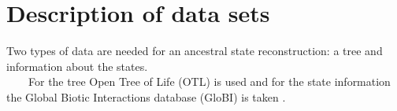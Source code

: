   \section{Description of data sets}
    Two types of data are needed for an ancestral state reconstruction: a tree and information about 
      the states. \\
    For the tree Open Tree of Life (OTL) is used \cite{Hinchliff2015} and for the state information 
      the Global Biotic Interactions database (GloBI) is taken \cite{Poelen2014}. \\

